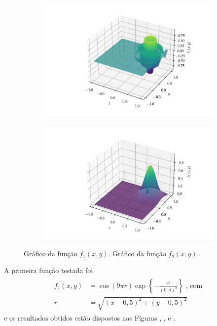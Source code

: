 \begin{figure}
  \begin{subfigure}{\textwidth}
    \centering
    \includegraphics[width=\textwidth]{imagens/graph_damped_cossine.png}
    \caption{}
    \label{fig:graph_damped_cossine}
  \end{subfigure}
  \begin{subfigure}{\textwidth}
    \centering
    \includegraphics[width=\textwidth]{imagens/graph_near_gaussians.png}
    \caption{}
    \label{fig:graph_near_gaussians}
  \end{subfigure}
  \caption{
     Gráfico da função $f_1(x,y)$.
     Gráfico da função $f_2(x,y)$.
  }
\end{figure}

A primeira função testada foi
\begin{align}
  \begin{split}    
    f_1(x,y) & = \cos(9\pi r)\exp\left\{-\frac{r^2}{(0,4)^2}\right\} \;\text{, com} \\
    r      & = \sqrt{
      \left(x - 0,5\right)^2 +
      \left(y - 0,5\right)^2
    }
  \end{split}
  \label{eq:func_damped_cossine}
\end{align}
e os resultados obtidos estão dispostos nas Figuras ,
,  e 
.

